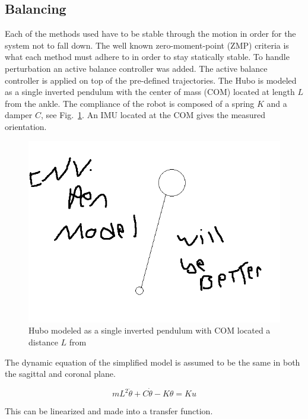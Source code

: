 \subsection{Balancing}\label{sec:sec:balance}
Each of the methods used have to be stable through the motion in order for the system not to fall down.  The well known zero-moment-point (ZMP) criteria is what each method must adhere to in order to stay statically stable\cite{Vukobratovic19721}.  To handle perturbation an active balance controller was added.  The active balance controller is applied on top of the pre-defined trajectories.  The Hubo is modeled as a single inverted pendulum with the center of mass (COM) located at length $L$ from the ankle.  The compliance of the robot is composed of a spring $K$ and a damper $C$, see Fig.~\ref{fig:invPen}.  An IMU located at the COM gives the measured orientation.

\begin{figure}[t]
  \centering
\includegraphics[width=1.0\columnwidth]{./pix/invPen.png}
  \caption{Hubo modeled as a single inverted pendulum with COM located a distance $L$ from }
  \label{fig:invPen}
\end{figure}

The dynamic equation of the simplified model is assumed to be the same in both the sagittal and coronal plane.

\begin{equation}
mL^2\ddot{\theta}+C\dot{\theta}-K\theta = Ku
\end{equation}

This can be linearized and made into a transfer function.

